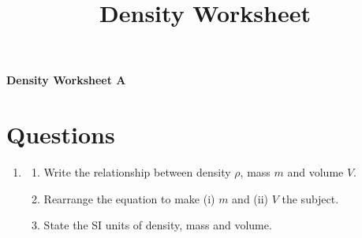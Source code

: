 \documentclass[11pt]{article}
\title{Density Worksheet}
\author{}
\date{}
\begin{document}
\begin{center}
    {\Large\bfseries Density Worksheet A}
\end{center}

\vspace{-0.5em}

\section*{Questions}

\begin{enumerate}
\item 
\begin{enumerate}
    \item Write the relationship between density $\rho$, mass $m$ and volume $V$.
    \item Rearrange the equation to make (i) $m$ and (ii) $V$ the subject.
    \item State the SI units of density, mass and volume.
\end{enumerate}


\end{enumerate}
\end{document}
